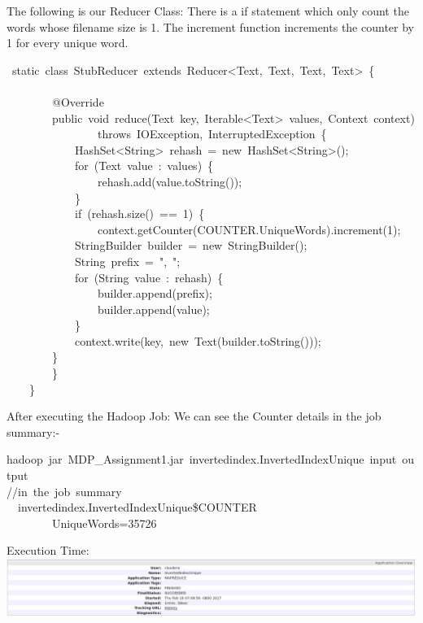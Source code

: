 \documentclass{article}
\begin{document}
The following is our Reducer Class:
There is a if statement which only count the words whose filename size is 1. The increment function increments the counter by 1 for every unique word.%
\begin{mdpre}%
~{static}~{class}~StubReducer~{extends}~Reducer\textless{}Text,~Text,~Text,~Text\textgreater{}~\{\\
\\
~~~~~~~~@Override\\
~~~~~~~~{public}~{void}~reduce(Text~key,~Iterable\textless{}Text\textgreater{}~values,~Context~context)\\
~~~~~~~~~~~~~~~~{throws}~IOException,~InterruptedException~\{\\
~~~~~~~~~~~~HashSet\textless{}String\textgreater{}~rehash~=~{new}~HashSet\textless{}String\textgreater{}();\\
~~~~~~~~~~~~{for}~(Text~value~:~values)~\{\\
~~~~~~~~~~~~~~~~rehash.add(value.{toString}());\\
~~~~~~~~~~~~\}\\
~~~~~~~~~~~~{if}~(rehash.size()~==~{1})~\{\\
~~~~~~~~~~~~~~~~context.getCounter(COUNTER.UniqueWords).increment({1});\\
~~~~~~~~~~~~StringBuilder~builder~=~{new}~StringBuilder();\\
~~~~~~~~~~~~String~prefix~=~{"}{,~}{"};\\
~~~~~~~~~~~~{for}~(String~value~:~rehash)~\{\\
~~~~~~~~~~~~~~~~builder.append(prefix);\\
~~~~~~~~~~~~~~~~builder.append(value);\\
~~~~~~~~~~~~\}\\
~~~~~~~~~~~~context.write(key,~{new}~Text(builder.{toString}()));\\
~~~~~~~~\}\\
~~~~~~~~\}\\
~~~~\}%
\end{mdpre}\noindent After executing the Hadoop Job: We can see the Counter details in the job summary:-
\begin{mdpre}%
\noindent hadoop~jar~MDP\_Assignment1.jar~invertedindex.InvertedIndexUnique~input~output\\
{//in~the~job~summary~~}\\
~~invertedindex.InvertedIndexUnique\$COUNTER\\
~~~~~~~~UniqueWords={35726}%
\end{mdpre}\noindent Execution Time:
\includegraphics[keepaspectratio=true,width=\dimmin{}{\dimwidth{1.30}}]{images/iiunique}{}
\end{document}
